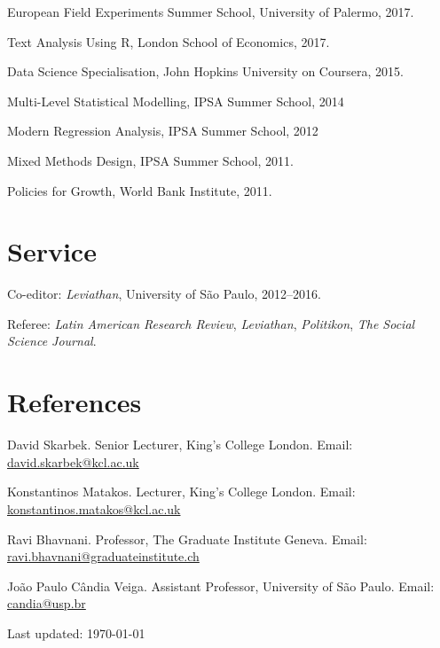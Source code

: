\documentclass[letterpaper]{article}
\renewenvironment{itemize}{
  \begin{list}{}{
    \setlength{\leftmargin}{1.5em}
  }
}{
  \end{list}
}
\begin{document}
\begin{itemize}
	\item European Field Experiments Summer School, University of Palermo, 2017.
	\item Text Analysis Using R, London School of Economics, 2017.
	\item Data Science Specialisation, John Hopkins University on Coursera, 2015.
	\item Multi-Level Statistical Modelling, IPSA Summer School, 2014
	\item Modern Regression Analysis, IPSA Summer School, 2012
	\item Mixed Methods Design, IPSA Summer School, 2011.
	\item Policies for Growth, World Bank Institute, 2011.
\end{itemize}

\section*{Service}

\begin{itemize}
	\item Co-editor: \textit{Leviathan}, University of S\~{a}o Paulo, 2012--2016.
	\item Referee: \textit{Latin American Research Review}, \textit{Leviathan}, \textit{Politikon}, \textit{The Social Science Journal}.
\end{itemize}

\section*{References}

\begin{itemize}
	\item David Skarbek. Senior Lecturer, King's College London. Email: \href{mailto:david.skarbek@kcl.ac.uk}{david.skarbek@kcl.ac.uk}
	\item Konstantinos Matakos. Lecturer, King's College London. Email: \href{mailto:konstantinos.matakos@kcl.ac.uk}{konstantinos.matakos@kcl.ac.uk}
	\item Ravi Bhavnani. Professor, The Graduate Institute Geneva. Email: \href{mailto:ravi.bhavnani@graduateinstitute.ch}{ravi.bhavnani@graduateinstitute.ch}
	\item Jo\~{a}o Paulo C\^{a}ndia Veiga. Assistant Professor, University of S\~{a}o Paulo. Email: \href{mailto:candia@usp.br}{candia@usp.br}
\end{itemize}

\bigskip

\begin{center}
	\begin{footnotesize}
		Last updated: \today
	\end{footnotesize}
\end{center}
\end{document}
